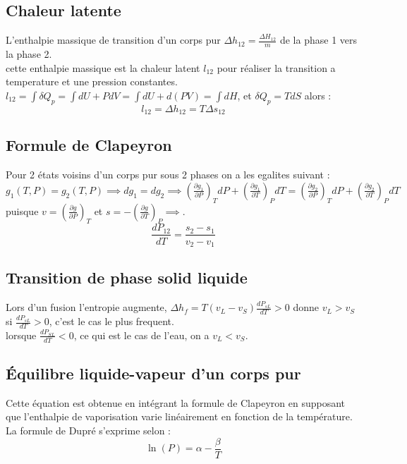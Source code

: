 \documentclass[12pt,oneside]{book}
\begin{document}
\subsection{Chaleur latente}
    L'enthalpie massique de transition d'un corps pur $\Delta h_{12} = \frac{\Delta H_{12}}{m}$ de la phase 1 vers la phase 2.\\
    cette enthalpie massique est la chaleur latent $l_{12}$ pour réaliser la transition a temperature et une pression constantes.\\
    $l_{12} = \int\delta Q_p = \int dU + PdV = \int dU + d(PV) = \int dH$, et $\delta Q_p = TdS$ alors :
    \[ l_{12} = \Delta h_{12} = T \Delta s_{12} \]
\subsection{Formule de Clapeyron}
    Pour 2 états voisins d'un corps pur sous 2 phases on a les egalites suivant :\\
    $g_1(T,P) = g_2(T,P) \implies dg_1 = dg_2 \implies (\frac{\partial g_1 }{\partial P})_TdP + (\frac{\partial g_1}{\partial T})_PdT = (\frac{\partial g_2 }{\partial P})_TdP + (\frac{\partial g_2}{\partial T})_PdT$\\
    puisque $v = (\frac{\partial g}{\partial P})_T$ et $s = -(\frac{\partial g}{\partial T})_P \implies $.
    \[ \boxed{\frac{dP_{12}}{dT} = \frac{s_2-s_1}{v_2-v_1}} \]
\subsection{Transition de phase solid liquide}
    Lors d'un fusion l'entropie augmente, $\Delta h_f = T(v_L-v_S)\frac{dP_{sL}}{dT} > 0$ donne $v_L > v_S$ si $ \frac{dP_{sL}}{dT} > 0$, c'est le cas le plus frequent.\\
    lorsque $\frac{dP_{SL}}{dT} < 0$, ce qui est le cas de l'eau, on a $v_L < v_S$.
\subsection{Équilibre liquide-vapeur d'un corps pur}
Cette équation est obtenue en intégrant la formule de Clapeyron en supposant que l'enthalpie de vaporisation varie linéairement en fonction de la température. La formule de Dupré s'exprime selon :
\[\ln(P) = \alpha - \frac{\beta}{T}\]
\end{document}
